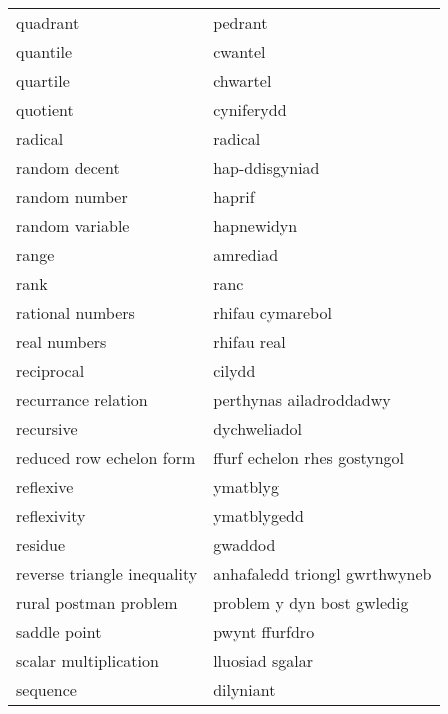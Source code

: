 \begin{supertabular}{p{0.22\textwidth}p{0.22\textwidth}}
                         quadrant &                          pedrant \\
                         quantile &                          cwantel \\
                         quartile &                         chwartel \\
                         quotient &                       cyniferydd \\
                          radical &                          radical \\
                    random decent &                   hap-ddisgyniad \\
                    random number &                           haprif \\
                  random variable &                       hapnewidyn \\
                            range &                         amrediad \\
                             rank &                             ranc \\
                 rational numbers &                 rhifau cymarebol \\
                     real numbers &                      rhifau real \\
                       reciprocal &                           cilydd \\
              recurrance relation &          perthynas ailadroddadwy \\
                        recursive &                     dychweliadol \\
         reduced row echelon form &     ffurf echelon rhes gostyngol \\
                        reflexive &                         ymatblyg \\
                      reflexivity &                      ymatblygedd \\
                          residue &                          gwaddod \\
      reverse triangle inequality &    anhafaledd triongl gwrthwyneb \\
            rural postman problem &       problem y dyn bost gwledig \\
                     saddle point &                   pwynt ffurfdro \\
            scalar multiplication &                  lluosiad sgalar \\
                         sequence &                        dilyniant \\

\end{supertabular}
